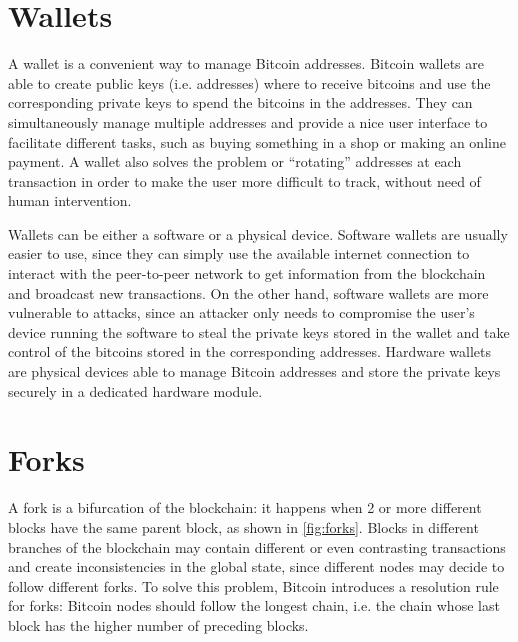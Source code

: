 \section{Wallets}
A wallet is a convenient way to manage Bitcoin addresses.
Bitcoin wallets are able to create public keys (i.e. addresses) where to receive bitcoins and use the corresponding private keys to spend the bitcoins in the addresses.
They can simultaneously manage multiple addresses and provide a nice user interface to facilitate different tasks, such as buying something in a shop or making an online payment.
A wallet also solves the problem or ``rotating'' addresses at each transaction in order to make the user more difficult to track, without need of human intervention.

Wallets can be either a software or a physical device.
Software wallets are usually easier to use, since they can simply use the available internet connection to interact with the peer-to-peer network to get information from the blockchain and broadcast new transactions.
On the other hand, software wallets are more vulnerable to attacks, since an attacker only needs to compromise the user's device running the software to steal the private keys stored in the wallet and take control of the bitcoins stored in the corresponding addresses.
Hardware wallets are physical devices able to manage Bitcoin addresses and store the private keys securely in a dedicated hardware module.

\section{Forks}
A fork is a bifurcation of the blockchain:
it happens when \num{2} or more different blocks have the same parent block, as shown in \cref{fig:forks}.
Blocks in different branches of the blockchain may contain different or even contrasting transactions and create inconsistencies in the global state, since different nodes may decide to follow different forks.
To solve this problem, Bitcoin introduces a resolution rule for forks:
Bitcoin nodes should follow the longest chain, i.e. the chain whose last block has the higher number of preceding blocks.

